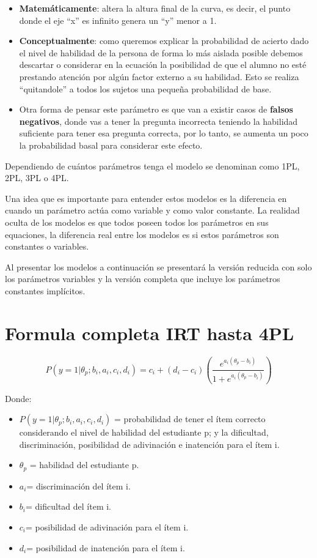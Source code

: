 \documentclass[
  letterpaper,
  DIV=11,
  numbers=noendperiod]{scrreprt}
\providecommand{\tightlist}{%
  \setlength{\itemsep}{0pt}\setlength{\parskip}{0pt}}
\begin{document}
\begin{enumerate}
  \begin{itemize}
  \item
    \textbf{Matemáticamente}: altera la altura final de la curva, es
    decir, el punto donde el eje ``x'' es infinito genera un ``y'' menor
    a 1.
  \item
    \textbf{Conceptualmente}: como queremos explicar la probabilidad de
    acierto dado el nivel de habilidad de la persona de forma lo más
    aislada posible debemos descartar o considerar en la ecuación la
    posibilidad de que el alumno no esté prestando atención por algún
    factor externo a su habilidad. Esto se realiza ``quitandole'' a
    todos los sujetos una pequeña probabilidad de base.
  \item
    Otra forma de pensar este parámetro es que van a existir casos de
    \textbf{falsos negativos}, donde vas a tener la pregunta incorrecta
    teniendo la habilidad suficiente para tener esa pregunta correcta,
    por lo tanto, se aumenta un poco la probabilidad basal para
    considerar este efecto.
  \end{itemize}
\end{enumerate}

Dependiendo de cuántos parámetros tenga el modelo se denominan como 1PL,
2PL, 3PL o 4PL.

Una idea que es importante para entender estos modelos es la diferencia
en cuando un parámetro actúa como variable y como valor constante. La
realidad oculta de los modelos es que todos poseen todos los parámetros
en sus equaciones, la diferencia real entre los modelos es si estos
parámetros son constantes o variables.

Al presentar los modelos a continuación se presentará la versión
reducida con solo los parámetros variables y la versión completa que
incluye los parámetros constantes implícitos.

\section{Formula completa IRT hasta
4PL}\label{formula-completa-irt-hasta-4pl}

\[
P(y=1|\theta_p;b_i,a_i,c_i,d_i) = c_i + (d_i-c_i)\left(\frac{e^{a_i(\theta_p-b_i)}}{1 + e^{a_i(\theta_p-b_i)}}\right)
\]

Donde:

\begin{itemize}
\tightlist
\item
  \(P(y=1|\theta_p;b_i,a_i,c_i,d_i)\) = probabilidad de tener el ítem
  correcto considerando el nivel de habilidad del estudiante p; y la
  dificultad, discriminación, posibilidad de adivinación e inatención
  para el ítem i.
\item
  \(\theta_p\) = habilidad del estudiante p.
\item
  \(a_i\)= discriminación del ítem i.
\item
  \(b_i\)= dificultad del ítem i.
\item
  \(c_i\)= posibilidad de adivinación para el ítem i.
\item
  \(d_i\)= posibilidad de inatención para el ítem i.
\end{itemize}
\end{document}
